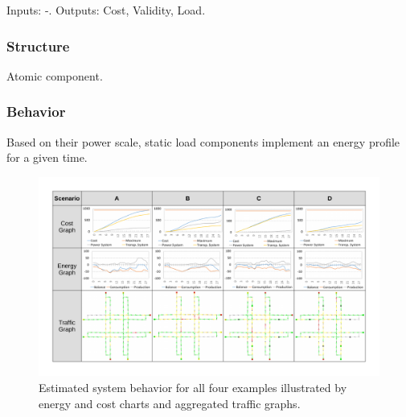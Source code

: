 Inputs: -. Outputs: Cost, Validity, Load.

\subsubsection{Structure}

Atomic component.

\subsubsection{Behavior}

Based on their power scale, static load components implement an energy profile for a given time. 

\begin{figure}[t]
	\centering
	\includegraphics[width=\textwidth]{../gfx/examples.pdf}
	\caption{Estimated system behavior for all four examples illustrated by energy and cost charts and aggregated traffic graphs.}
	\label{figure:examples}
\end{figure}